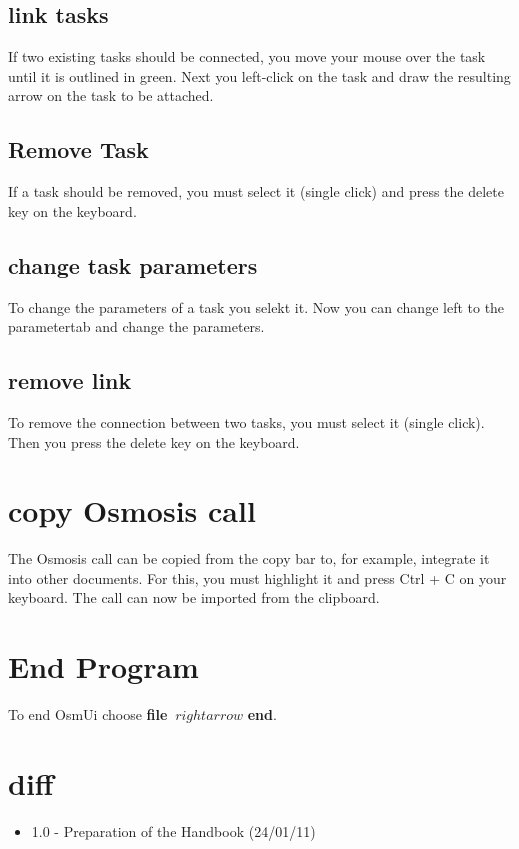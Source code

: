 \documentclass[a4paper,10pt]{scrartcl}
\begin{document}
\subsection {link tasks}
If two existing tasks should be connected, you move your mouse over the task until it is outlined in green. Next you left-click on the task and draw the resulting arrow on the task to be attached.
\subsection {Remove Task}
If a task should be removed, you must select it (single click) and press the delete key on the keyboard.
\subsection {change task parameters}
To change the parameters of a task you selekt it. Now you can change left to the parametertab and change the parameters.
\subsection {remove link}
To remove the connection between two tasks, you must select it (single click). Then you press the delete key on the keyboard.

\section {copy Osmosis call}
The Osmosis call can be copied from the copy bar to, for example, integrate it into other documents. For this, you must highlight it and press Ctrl + C on your keyboard. The call can now be imported from the clipboard.


\section {End Program}
To end OsmUi choose \textbf {file} $ \ rightarrow $ \textbf {end}.

\section {diff}
\begin {itemize}
\item 1.0 - Preparation of the Handbook (24/01/11)
\end {itemize}
\end{document}

